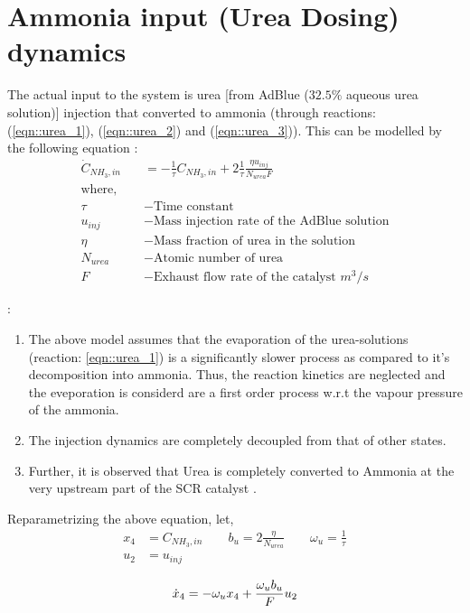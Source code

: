 \section{Ammonia input (Urea Dosing) dynamics}
The actual input to the system is urea [from AdBlue ($32.5\%$ aqueous urea
solution)] injection that converted to ammonia (through reactions:
(\ref{eqn::urea_1}), (\ref{eqn::urea_2}) and (\ref{eqn::urea_3})). This can be modelled by the following equation \cite{nova2014urea}:
\begin{align*}
    \dot C_{NH_3, in} &= - \frac{1}{\tau} C_{NH_3, in} + 2 \frac{1}{\tau} \frac{ \eta u_{inj}}{N_{urea} F}\\
    \text{where, } \quad &\\
    \tau &- \text{Time constant}\\
    u_{inj} &- \text{Mass injection rate of the AdBlue solution}\\
    \eta &- \text{Mass fraction of urea in the solution}\\
    N_{urea} &- \text{Atomic number of urea}\\
    F &- \text{Exhaust flow rate of the catalyst } m^3/s
\end{align*}

:
\begin{enumerate}
    \item The above model assumes that the evaporation of the urea-solutions
        (reaction: \ref{eqn::urea_1}) is a significantly slower process as
        compared to it's decomposition into ammonia. Thus, the reaction
        kinetics are neglected and the eveporation is considerd are a first
        order process w.r.t the vapour pressure of the ammonia.
    \item The injection dynamics are completely decoupled from that of other
        states.
    \item Further, it is observed that Urea is completely converted to Ammonia
        at the very upstream part of the SCR catalyst
        \cite{hsieh2011development}.
\end{enumerate}

Reparametrizing the above equation, let,
\begin{align*}
    x_4 &= C_{NH_3, in} \qquad b_u = 2 \frac{ \eta}{N_{urea}} \qquad \omega_u = \frac{1}{\tau}\\
    u_2 &= u_{inj}
\end{align*}

\begin{equation}{\label{eqn::urea_inj}}
    \dot x_4 = - \omega_u x_4 +   \frac{\omega_u b_u}{F} u_{2}
\end{equation}
